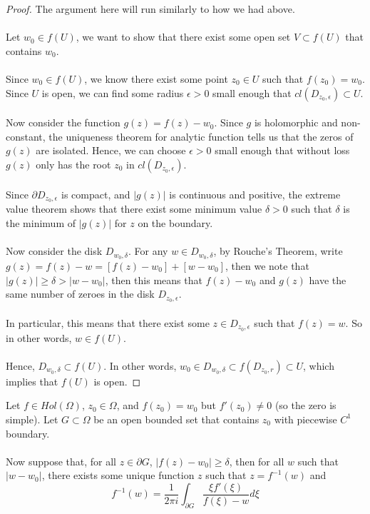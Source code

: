 \begin{proof}
The argument here will run similarly to how we had above.\\\\
Let $w_0 \in f(U)$, we want to show that there exist some open set $V \subset f(U)$ that contains $w_0$.\\\\
Since $w_0 \in f(U)$, we know there exist some point $z_0 \in U$ such that $f(z_0) = w_0$. Since $U$ is open, we can find some radius $\epsilon > 0$ small enough that $cl(D_{z_0, \epsilon}) \subset U$.\\\\
Now consider the function $g(z) = f(z) - w_0$. Since $g$ is holomorphic and non-constant, the uniqueness theorem for analytic function tells us that the zeros of $g(z)$ are isolated. Hence, we can choose $\epsilon > 0$ small enough that without loss $g(z)$ only has the root $z_0$ in $cl(D_{z_0, \epsilon})$.\\\\
Since $\partial D_{z_0, \epsilon}$ is compact, and $|g(z)|$ is continuous and positive, the extreme value theorem shows that there exist some minimum value $\delta > 0$ such that $\delta$ is the minimum of $|g(z)|$ for $z$ on the boundary.\\\\
Now consider the disk $D_{w_0, \delta}$. For any $w \in D_{w_0, \delta}$, by Rouche's Theorem, write $g(z) = f(z) - w = [f(z) - w_0] + [w - w_0]$, then we note that $|g(z)| \geq \delta > |w - w_0|$, then this means that $f(z) - w_0$ and $g(z)$ have the same number of zeroes in the disk $D_{z_0, \epsilon}$.\\\\
In particular, this means that there exist some $z \in D_{z_0, \epsilon}$ such that $f(z) = w$. So in other words, $w \in f(U)$.\\\\
Hence, $D_{w_0, \delta} \subset f(U)$. In other words, $w_0 \in D_{w_0, \delta} \subset f(D_{z_0, r}) \subset U$, which implies that $f(U)$ is open.
\end{proof}

\begin{theorem}
Let $f \in Hol(\Omega)$, $z_0 \in \Omega$, and $f(z_0) = w_0$ but $f'(z_0) \neq 0$ (so the zero is simple). Let $G \subset \Omega$ be an open bounded set that contains $z_0$ with piecewise $C^1$ boundary.\\\\
Now suppose that, for all $z \in \partial G$, $|f(z) - w_0| \geq \delta$, then for all $w$ such that $|w - w_0|$, there exists some unique function $z$ such that $z = f^{-1}(w)$ and
\[f^{-1}(w) = \frac{1}{2\pi i} \int_{\partial G} \frac{\xi f'(\xi)}{f(\xi) - w} d\xi\]
\end{theorem}